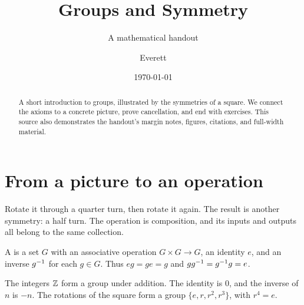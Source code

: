 \documentclass[10pt,a4paper,oneside]{scrartcl}
\title{Groups and Symmetry}
\subtitle{A mathematical handout}
\author{Everett}
\date{\today}
\begin{document}
\maketitle

\begin{abstract}
A short introduction to groups, illustrated by the symmetries of a square.
We connect the axioms to a concrete picture, prove cancellation, and end
with exercises. This source also demonstrates the handout's margin notes,
figures, citations, and full-width material.
\end{abstract}

\section{From a picture to an operation}

 Rotate it through a quarter turn, then
rotate it again. The result is another symmetry: a half turn.
The operation is composition, and its inputs and outputs all belong to
the same collection.

\begin{marginfigure}
\centering
{}
\caption{A quarter turn $r$ cycles the four vertices. Four quarter turns
return every vertex to its starting position.}
\label{fig:square}
\end{marginfigure}

\begin{definition}[Group]\label{def:group}
A  is a set $G$ with an associative operation
$G\times G\to G$, an identity $e$, and an inverse $g^{-1}$ for each $g\in G$.
Thus $eg=ge=g$ and $gg^{-1}=g^{-1} g=e$.
\end{definition}

\begin{eg}
The integers $\mathbb Z$ form a group under addition. The identity is $0$,
and the inverse of $n$ is $-n$. The rotations of the square form a group
$\{e,r,r^2,r^3\}$, with $r^4=e$.
\end{eg}
\end{document}
